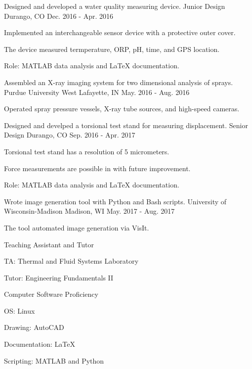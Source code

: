 \begin{cventries}
  \cventry
    {Designed and developed a water quality measuring device.}
    {Junior Design}
    {Durango, CO}
    {Dec. 2016 - Apr. 2016}
    {
      \begin{cvitems}
        \item {Implemented an interchangeable sensor device with a protective outer cover.}
        \item {The device measured termperature, ORP, pH, time, and GPS location.}
        \item {Role: MATLAB data analysis and LaTeX documentation.}
      \end{cvitems}
    }
    
  \cventry
    {Assembled an X-ray imaging system for two dimensional analysis of sprays.}
    {Purdue University}
    {West Lafayette, IN}
    {May. 2016 - Aug. 2016}
    {
      \begin{cvitems}
        \item {Operated spray pressure vessels, X-ray tube sources, and high-speed cameras.}
      \end{cvitems}
    }
    
  \cventry
    {Designed and develped a torsional test stand for measuring displacement.}
    {Senior Design}
    {Durango, CO}
    {Sep. 2016 - Apr. 2017}
    {
      \begin{cvitems}
        \item {Torsional test stand has a resolution of 5 micrometers.}
        \item {Force measurements are possible in with future improvement.}
        \item {Role: MATLAB data analysis and LaTeX documentation.}
      \end{cvitems}
    }
    
  \cventry
    {Wrote image generation tool with Python and Bash scripts.}
    {University of Wisconsin-Madison}
    {Madison, WI}
    {May. 2017 - Aug. 2017}
    {
      \begin{cvitems}
        \item {The tool automated image generation via VisIt.}
      \end{cvitems}
    }

  \cventry
    {}
    {Teaching Assistant and Tutor}
    {}
    {}
    {
      \begin{cvitems}
        \item {TA: Thermal and Fluid Systems Laboratory}
        \item {Tutor: Engineering Fundamentals II}
      \end{cvitems}
    }
  \cventry
    {}
    {Computer Software Proficiency}
    {}
    {}
    {
      \begin{cvitems}
        \item {OS: Linux}
        \item {Drawing: AutoCAD}
        \item {Documentation: LaTeX}
        \item {Scripting: MATLAB and Python}
      \end{cvitems}
    }

\end{cventries}
